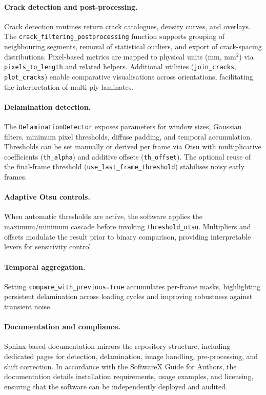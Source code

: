 \documentclass[preprint,12pt,a4paper]{elsarticle}
\begin{document}
\paragraph{Crack detection and post-processing.} Crack detection routines return crack catalogues, density
curves, and overlays. The \texttt{crack\_filtering\_postprocessing} function supports grouping of
neighbouring segments, removal of statistical outliers, and export of crack-spacing distributions.
Pixel-based metrics are mapped to physical units (mm, mm\(^2\)) via \texttt{pixels\_to\_length} and
related helpers. Additional utilities (\texttt{join\_cracks}, \texttt{plot\_cracks}) enable comparative
visualisations across orientations, facilitating the interpretation of multi-ply laminates.

\paragraph{Delamination detection.} The \texttt{DelaminationDetector} exposes parameters for window
sizes, Gaussian filters, minimum pixel thresholds, diffuse padding, and temporal accumulation. Thresholds
can be set manually or derived per frame via Otsu with multiplicative coefficients (\texttt{th\_alpha})
and additive offsets (\texttt{th\_offset}). The optional reuse of the final-frame threshold
(\texttt{use\_last\_frame\_threshold}) stabilises noisy early frames.

\paragraph{Adaptive Otsu controls.} When automatic thresholds are active, the software applies the
maximum/minimum cascade before invoking \texttt{threshold\_otsu}. Multipliers and offsets modulate the
result prior to binary comparison, providing interpretable levers for sensitivity control.

\paragraph{Temporal aggregation.} Setting \texttt{compare\_with\_previous=True} accumulates
per-frame masks, highlighting persistent delamination across loading cycles and improving robustness
against transient noise.

\paragraph{Documentation and compliance.} Sphinx-based documentation mirrors the repository structure,
including dedicated pages for detection, delamination, image handling, pre-processing, and shift
correction. In accordance with the SoftwareX Guide for Authors, the documentation details installation
requirements, usage examples, and licensing, ensuring that the software can be independently deployed and
audited.
\end{document}
